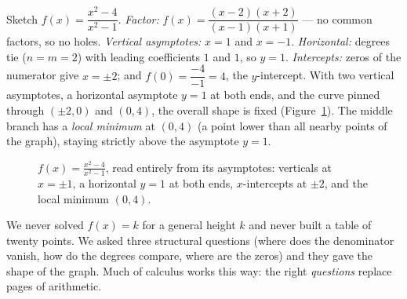 \begin{example}
\label{ch09:ex-full}
Sketch $f(x)=\dfrac{x^2-4}{x^2-1}$.
\emph{Factor:} $f(x)=\dfrac{(x-2)(x+2)}{(x-1)(x+1)}$ --- no common factors, so no
holes. \emph{Vertical asymptotes:} $x=1$ and $x=-1$. \emph{Horizontal:} degrees
tie ($n=m=2$) with leading coefficients $1$ and $1$, so $y=1$. \emph{Intercepts:}
zeros of the numerator give $x=\pm 2$; and $f(0)=\dfrac{-4}{-1}=4$, the
$y$-intercept. With two vertical asymptotes, a horizontal asymptote $y=1$ at both ends, and
the curve pinned through $(\pm2,0)$ and $(0,4)$, the overall shape is fixed
(Figure~\ref{ch09:fig-full}). The
middle branch has a \emph{local minimum} at $(0,4)$ (a point lower than all
nearby points of the graph), staying strictly above the asymptote $y=1$.
\end{example}

\begin{figure}[htbp]
\centering
{}
\caption{$f(x)=\frac{x^2-4}{x^2-1}$, read entirely from its asymptotes:
verticals at $x=\pm1$, a horizontal $y=1$ at both ends, $x$-intercepts at
$\pm2$, and the local minimum $(0,4)$.}
\label{ch09:fig-full}
\end{figure}

\begin{aestheticbox}
We never solved $f(x)=k$ for a general height $k$ and never
built a table of twenty points. We asked three structural questions (where
does the denominator vanish, how do the degrees compare, where are the zeros)
and they gave the shape of the graph. Much of calculus works this way: the right
\emph{questions} replace pages of arithmetic.
\end{aestheticbox}


